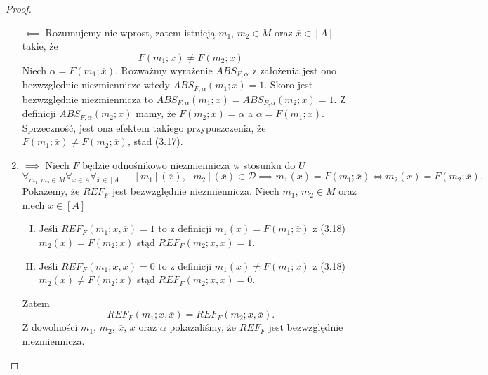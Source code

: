 \documentclass[12pt,a4paper]{report}
\newcommand{\domkniecie}[1]{\left\lbrack{#1}\right\rbrack}
\begin{document}
\begin{proof}
\begin{enumerate}
$\impliedby$
Rozumujemy nie wprost, zatem istnieją $m_1$, $m_2 \in M$ oraz $\overline{x} \in \domkniecie{A}$ takie, że
$$
F(m_1;\overline{x})\ne F(m_2;\overline{x})
$$
Niech $\alpha=F(m_1;\overline{x})$. Rozważmy wyrażenie $ABS_{F,\alpha}$  z założenia jest ono bezwzględnie niezmiennicze wtedy $ABS_{F,\alpha}(m_1;\overline{x})=1$. Skoro jest bezwzględnie niezmiennicza  to $ABS_{F,\alpha}(m_1;\overline{x})=ABS_{F,\alpha}(m_2;\overline{x})=1$. Z definicji $ABS_{F,\alpha}(m_2;\overline{x})$ mamy, że $F(m_2;\overline{x})=\alpha$ a $\alpha=F(m_1;\overline{x})$. Sprzeczność, jest ona efektem takiego przypuszczenia, że $F(m_1;\overline{x})\ne F(m_2;\overline{x})$, stad (3.17).
\item
$\implies$
Niech $F$ będzie odnośnikowo niezmiennicza w stosunku do $U$ 
\begin{equation}
\forall_{m_{1}, m_{2} \in M} \forall_{x \in A} \forall_{\overline{x} \in \domkniecie{A}} \quad \domkniecie{m_1}(\overline{x}), \domkniecie{m_2}(\overline{x})\in \mathcal{D} \implies  m_{1}(x)=F(m_{1};\overline{x}) \iff m_{2}(x)=F(m_{2};\overline{x}).
\end{equation}
Pokażemy, że $REF_{F}$ jest bezwzględnie niezmiennicza. Niech $m_1$, $m_2 \in M$ oraz niech $\overline{x} \in \domkniecie{A}$ 
\begin{enumerate}[I.]
\item
Jeśli $REF_{F}(m_1;x,\overline{x})=1$ to z definicji $m_1(x)=F(m_1;\overline{x})$ z (3.18) $m_2(x)=F(m_2;\overline{x})$ stąd $REF_{F}(m_2;x,\overline{x})=1$.
\item
Jeśli $REF_{F}(m_1;x,\overline{x})=0$ to z definicji $m_1(x)\ne F(m_1;\overline{x})$ z (3.18) $m_2(x)\ne F(m_2;\overline{x})$ stąd $REF_{F}(m_2;x,\overline{x})=0$.
\end{enumerate}
Zatem 
$$
REF_{F}(m_1;x,\overline{x})=REF_{F}(m_2;x,\overline{x}).
$$
Z dowolności $m_1$, $m_2$, $\overline{x}$, $x$ oraz $\alpha$ pokazaliśmy, że $REF_{F}$ jest bezwzględnie niezmiennicza.


\end{enumerate}
\end{proof}
\end{document}
